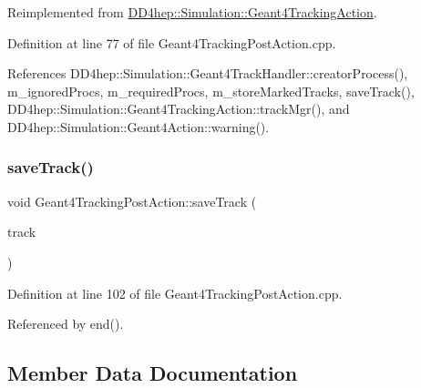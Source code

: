Reimplemented from \hyperlink{class_d_d4hep_1_1_simulation_1_1_geant4_tracking_action_a29f980c180576781771ea325b4a73f14}{D\+D4hep\+::\+Simulation\+::\+Geant4\+Tracking\+Action}.



Definition at line 77 of file Geant4\+Tracking\+Post\+Action.\+cpp.



References D\+D4hep\+::\+Simulation\+::\+Geant4\+Track\+Handler\+::creator\+Process(), m\+\_\+ignored\+Procs, m\+\_\+required\+Procs, m\+\_\+store\+Marked\+Tracks, save\+Track(), D\+D4hep\+::\+Simulation\+::\+Geant4\+Tracking\+Action\+::track\+Mgr(), and D\+D4hep\+::\+Simulation\+::\+Geant4\+Action\+::warning().

\hypertarget{class_d_d4hep_1_1_simulation_1_1_geant4_tracking_post_action_a9ff02148f329e54a340e623d79b1f9c3}{}\label{class_d_d4hep_1_1_simulation_1_1_geant4_tracking_post_action_a9ff02148f329e54a340e623d79b1f9c3} 
\subsubsection{\texorpdfstring{save\+Track()}{saveTrack()}}
{\footnotesize\ttfamily void Geant4\+Tracking\+Post\+Action\+::save\+Track (\begin{DoxyParamCaption}\item[{const G4\+Track $\ast$}]{track }\end{DoxyParamCaption})}



Definition at line 102 of file Geant4\+Tracking\+Post\+Action.\+cpp.



Referenced by end().



\subsection{Member Data Documentation}
\hypertarget{class_d_d4hep_1_1_simulation_1_1_geant4_tracking_post_action_abf458624a8077fc4533d3c830b9e240f}{}\label{class_d_d4hep_1_1_simulation_1_1_geant4_tracking_post_action_abf458624a8077fc4533d3c830b9e240f} 
